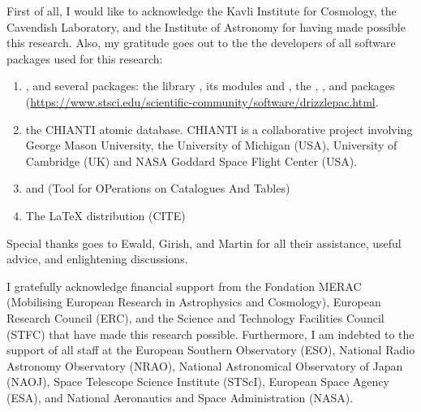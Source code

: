 
\begin{acknowledgements}      
    
    First of all, I would like to acknowledge the Kavli Institute for Cosmology, the Cavendish Laboratory, and the Institute of Astronomy for having made possible this research. Also, my gratitude goes out to the the developers of all software packages used for this research:
    \begin{enumerate}
        \item {}, and several packages: the  library \citep{Jones2001}, its modules  \citep{2011CSE....13b..22V} and  \citep{Hunter2007}, the  \citep{2013A&A...558A..33A, 2018AJ....156..123A},  \citep{2009MNRAS.398.1601F, 2014A&A...564A.125B}, and  packages (\url{https://www.stsci.edu/scientific-community/software/drizzlepac.html}.
        \item the CHIANTI atomic database. CHIANTI is a collaborative project involving George Mason University, the University of Michigan (USA), University of Cambridge (UK) and NASA Goddard Space Flight Center (USA).
        \item {} and  (Tool for OPerations on Catalogues And Tables)
        \item The LaTeX distribution (CITE) %
    \end{enumerate}
    
    Special thanks goes to Ewald, Girish, and Martin for all their assistance, useful advice, and enlightening discussions.
    
    I gratefully acknowledge financial support from the Fondation MERAC (Mobilising European Research in Astrophysics and Cosmology), European Research Council (ERC), and the Science and Technology Facilities Council (STFC) that have made this research possible. Furthermore, I am indebted to the support of all staff at the European Southern Observatory (ESO), National Radio Astronomy Observatory (NRAO), National Astronomical Observatory of Japan (NAOJ), Space Telescope Science Institute (STScI), European Space Agency (ESA), and National Aeronautics and Space Administration (NASA).
    
\end{acknowledgements}
